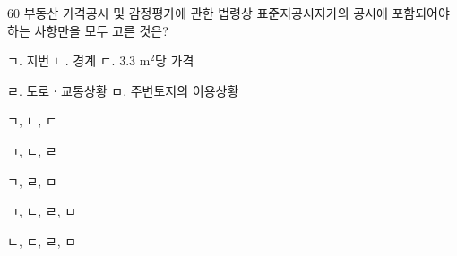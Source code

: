 \begin{question}{60}
부동산 가격공시 및 감정평가에 관한 법령상 표준지공시지가의 공시에 포함되어야 하는 사항만을 모두 고른 것은?
\begin{framedtext}
ㄱ. 지번 \quad ㄴ. 경계 \quad ㄷ. 3.3 m$^2$당 가격 \par
ㄹ. 도로ㆍ교통상황 \quad ㅁ. 주변토지의 이용상황 \par
\end{framedtext}
\begin{choices}
  \item ㄱ, ㄴ, ㄷ
  \item ㄱ, ㄷ, ㄹ
  \item ㄱ, ㄹ, ㅁ
  \item ㄱ, ㄴ, ㄹ, ㅁ
  \item ㄴ, ㄷ, ㄹ, ㅁ
\end{choices}
\end{question}
